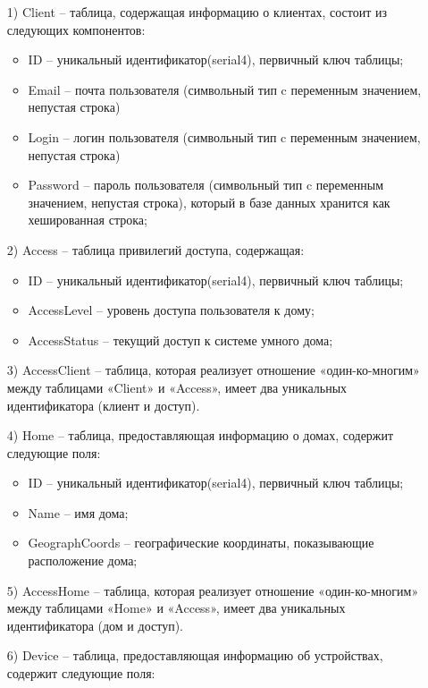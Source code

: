 \begin{enumerate}
    \item[1)] Client -- таблица, содержащая информацию о клиентах, 
    состоит из следующих компонентов:
    \begin{itemize}
        \item ID -- уникальный идентификатор(serial4), первичный ключ таблицы;
        \item Email -- почта пользователя (символьный тип c переменным значением, непустая строка)
        \item Login -- логин пользователя (символьный тип c переменным значением, непустая строка)
        \item Password -- пароль пользователя (символьный тип c переменным значением, непустая строка), который 
        в базе данных хранится как хешированная строка;
    \end{itemize}
    \item[2)] Access -- таблица привилегий доступа, содержащая:
    \begin{itemize}
        \item ID -- уникальный идентификатор(serial4), первичный ключ таблицы;
        \item AccessLevel -- уровень доступа пользователя к дому;
        \item AccessStatus -- текущий доступ к системе умного дома; 
    \end{itemize}
    \item[3)] AccessClient -- таблица, которая реализует отношение 
    «один-ко-многим» между таблицами «Client» и «Access», 
    имеет два уникальных идентификатора (клиент и доступ).
    \item[4)] Home -- таблица, предоставляющая информацию о домах, содержит следующие поля:
    \begin{itemize}
        \item ID -- уникальный идентификатор(serial4), первичный ключ таблицы;
        \item Name -- имя дома;
        \item GeographCoords -- географические координаты, показывающие расположение дома;
    \end{itemize}
    \item[5)] AccessHome -- таблица, которая реализует отношение 
    «один-ко-многим» между таблицами «Home» и «Access»,
    имеет два уникальных идентификатора (дом и доступ).
    \item[6)] Device -- таблица, предоставляющая информацию об устройствах, содержит следующие поля:

\end{enumerate}
